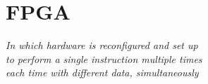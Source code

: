 \chapter{FPGA}\label{ch:fpga}

\begin{flushright}{\slshape
    In which hardware is reconfigured and set up\\
    to perform a single instruction multiple times\\
    each time with different data, simultaneously
}
\end{flushright}
